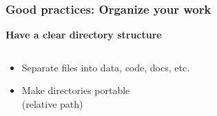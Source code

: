 \documentclass[xcolor=x11names,compress, aspectratio=169]{beamer}
\renewcommand{\(}{\begin{columns}}
\renewcommand{\)}{\end{columns}}
\newcommand{\<}[1]{\begin{column}{#1}}
\renewcommand{\>}{\end{column}}
\begin{document}
\begin{frame}
\frametitle{\textbf{Good practices:} Organize your work }
\textcolor{siap}{\textbf{Have a clear directory structure}}
 \pause
\begin{columns}[t]
 \begin{column}{0.4\textwidth}

    \begin{itemize}[<+->]
   \item Separate files into data, code, docs, etc.
   \item Make directories portable\\ (relative path)
    \end{itemize}
\end{column}
  \begin{column}{0.6\textwidth}
    \begin{center}
    \begin{itemize}
    \end{itemize}
    \end{center}
  \end{column}
\end{columns}
\end{frame}
\end{document}
